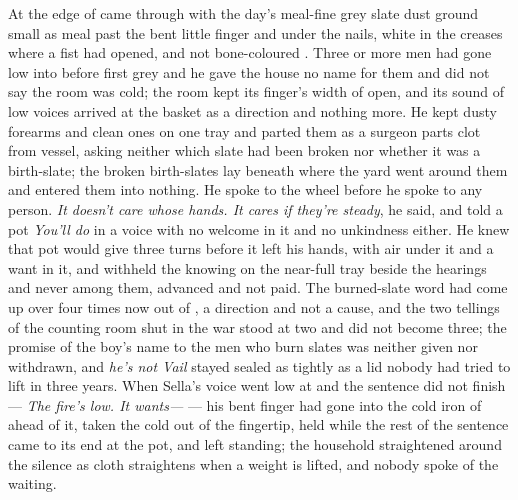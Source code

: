At the edge of   came through with the day's meal-fine grey slate dust ground small as meal past the bent little finger and under the nails, white in the creases where a fist had opened, and not bone-coloured . Three or more men had gone low into  before first grey and he gave the house no name for them and did not say the room was cold; the room kept its finger's width of open, and its sound of low voices arrived at the basket as a direction and nothing more. He kept dusty forearms and clean ones on one tray and parted them as a surgeon parts clot from vessel, asking neither which slate had been broken nor whether it was a birth-slate; the broken birth-slates lay beneath  where the yard went around them and entered them into nothing. He spoke to the wheel before he spoke to any person. \emph{It doesn't care whose hands. It cares if they're steady}, he said, and told a pot \emph{You'll do} in a voice with no welcome in it and no unkindness either. He knew  that pot would give three turns before it left his hands, with air under it and a want in it, and withheld the knowing on the near-full tray beside the hearings and never among them, advanced and not paid. The burned-slate word had come up over  four times now out of , a direction and not a cause, and the two tellings of the counting room shut in the war stood at two and did not become three; the promise of the boy's name to the men who burn slates was neither given nor withdrawn, and \emph{he's not Vail} stayed sealed as tightly as a lid nobody had tried to lift in three years. When Sella's voice went low at  and the sentence did not finish --- \emph{The fire's low. It wants---} --- his bent finger had gone into the cold iron of  ahead of it, taken the cold out of the fingertip, held while the rest of the sentence came to its end at the pot, and left standing; the household straightened around the silence as cloth straightens when a weight is lifted, and nobody spoke of the waiting.

\scenebreak


